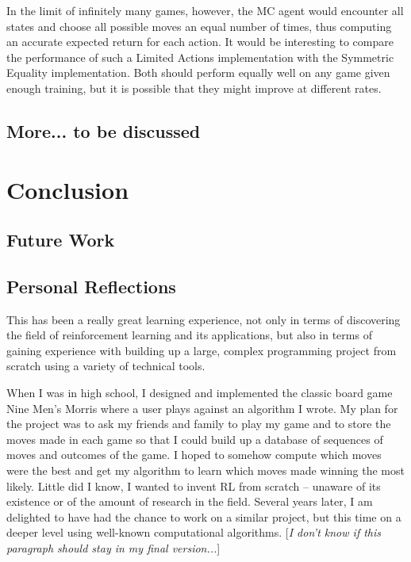 \documentclass[11pt,a4paper]{report}
\begin{document}
In the limit of infinitely many games, however, the MC agent would encounter all states and choose all possible moves an equal number of times, thus computing an accurate expected return for each action. It would be interesting to compare the performance of such a Limited Actions implementation with the Symmetric Equality implementation. Both should perform equally well on any game given enough training, but it is possible that they might improve at different rates.


\section{More... to be discussed}


\chapter{Conclusion}


\section{Future Work}


\section{Personal Reflections}

This has been a really great learning experience, not only in terms of discovering the field of reinforcement learning and its applications, but also in terms of gaining experience with building up a large, complex programming project from scratch using a variety of technical tools.

When I was in high school, I designed and implemented the classic board game Nine Men’s Morris where a user plays against an algorithm I wrote. My plan for the project was to ask my friends and family to play my game and to store the moves made in each game so that I could build up a database of sequences of moves and outcomes of the game. I hoped to somehow compute which moves were the best and get my algorithm to learn which moves made winning the most likely. Little did I know, I wanted to invent RL from scratch – unaware of its existence or of the amount of research in the field. Several years later, I am delighted to have had the chance to work on a similar project, but this time on a deeper level using well-known computational algorithms. [\emph{I don't know if this paragraph should stay in my final version...}]
\end{document}
